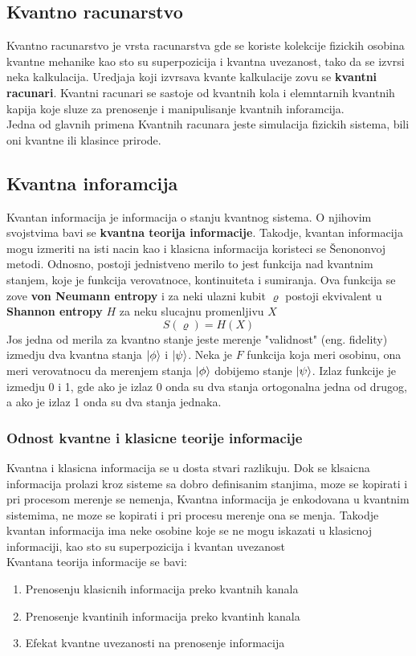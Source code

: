 \documentclass[12pt, letterpaper, oneside]{article}
\begin{document}
\subsection{Kvantno racunarstvo}
Kvantno racunarstvo je vrsta racunarstva gde se koriste kolekcije fizickih osobina kvantne mehanike kao sto su superpozicija i kvantna uvezanost,
tako da se izvrsi neka kalkulacija. Uredjaja koji izvrsava kvante kalkulacije zovu se \textbf{kvantni racunari}.
Kvantni racunari se sastoje od kvantnih kola i elemntarnih kvantnih kapija koje sluze za prenosenje i manipulisanje kvantnih inforamcija.
\cite{nielsen_chuang_10th} \\
Jedna od glavnih primena Kvantnih racunara jeste simulacija fizickih sistema, bili oni kvantne ili klasince prirode.
\subsection{Kvantna inforamcija}
Kvantan informacija je informacija o stanju kvantnog sistema. O njihovim svojstvima bavi se \textbf{kvantna teorija informacije}.
Takodje, kvantan informacija mogu izmeriti na isti nacin kao i klasicna informacija koristeci se Šenononvoj metodi. 
Odnosno, postoji jednistveno merilo to jest funkcija nad kvantnim stanjem, koje je funkcija verovatnoce, kontinuiteta i sumiranja.\cite{vlatko_v}
Ova funkcija se zove \textbf{von Neumann entropy} i za neki ulazni kubit $\varrho$ postoji ekvivalent u  \textbf{Shannon entropy} $H$
za neku slucajnu promenljivu $X$
\[
    S(\varrho) = H(X)
\]
Jos jedna od merila za kvantno stanje jeste merenje "validnost" (eng. fidelity) izmedju dva kvantna stanja $ \ket{\phi}$ i $\ket{\psi}$.
Neka je $F$ funkcija koja meri osobinu, ona meri verovatnocu da merenjem stanja $\ket{\phi}$ dobijemo stanje $\ket{\psi}$.
Izlaz funkcije je izmedju 0 i 1, gde ako je izlaz 0 onda su dva stanja ortogonalna jedna od drugog, a ako je izlaz 1 onda su dva stanja jednaka.\cite{vlatko_v}
\subsubsection*{Odnost kvantne i klasicne teorije informacije}
Kvantna i klasicna informacija se u dosta stvari razlikuju. Dok se klsaicna informacija prolazi kroz sisteme sa dobro definisanim stanjima, moze se kopirati i pri procesom merenje se nemenja,
Kvantna informacija je enkodovana u kvantnim sistemima, ne moze se kopirati i pri procesu merenje ona se menja. Takodje kvantan informacija ima neke osobine koje se ne
mogu iskazati u klasicnoj informaciji, kao sto su superpozicija i kvantan uvezanost \cite{Classical&quantum_info} \\
Kvantana teorija informacije se bavi: 
\begin{enumerate}
    \item Prenosenju klasicnih informacija preko kvantnih kanala
    \item Prenosenje kvantinih informacija preko kvantinh kanala
    \item Efekat kvantne uvezanosti na prenosenje informacija
\end{enumerate}
\end{document}
